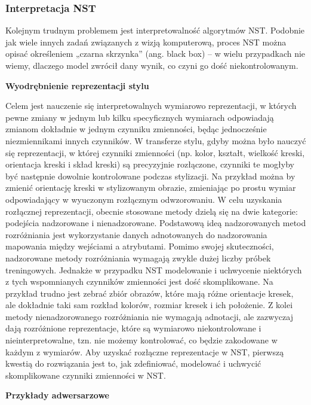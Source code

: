 \documentclass[12pt]{article}
\begin{document}
\subsubsection{Interpretacja NST}

\indent

Kolejnym trudnym problemem jest interpretowalność algorytmów NST. Podobnie jak wiele innych zadań związanych z wizją komputerową, proces NST można opisać określeniem „czarna skrzynka” (ang. black box) – w wielu przypadkach nie wiemy, dlaczego model zwrócił dany wynik, co czyni go dość niekontrolowanym.

\noindent\textbf{Wyodrębnienie reprezentacji stylu}

Celem jest nauczenie się interpretowalnych wymiarowo reprezentacji, w których pewne zmiany w jednym lub kilku specyficznych wymiarach odpowiadają zmianom dokładnie w jednym czynniku zmienności, będąc jednocześnie niezmiennikami innych czynników. W transferze stylu, gdyby można było nauczyć się reprezentacji, w której czynniki zmienności (np. kolor, kształt, wielkość kreski, orientacja kreski i skład kreski) są precyzyjnie rozłączone, czynniki te mogłyby być następnie dowolnie kontrolowane podczas stylizacji. Na przykład można by zmienić orientację kreski w stylizowanym obrazie, zmieniając po prostu wymiar odpowiadający w wyuczonym rozłącznym odwzorowaniu. W celu uzyskania rozłącznej reprezentacji, obecnie stosowane metody dzielą się na dwie kategorie: podejścia nadzorowane i nienadzorowane. Podstawową ideą nadzorowanych metod rozróżniania jest wykorzystanie danych adnotowanych do nadzorowania mapowania między wejściami a atrybutami. Pomimo swojej skuteczności, nadzorowane metody rozróżniania wymagają zwykle dużej liczby próbek treningowych. Jednakże w przypadku NST modelowanie i uchwycenie niektórych z tych wspomnianych czynników zmienności jest dość skomplikowane. Na przykład trudno jest zebrać zbiór obrazów, które mają różne orientacje kresek, ale dokładnie taki sam rozkład kolorów, rozmiar kresek i ich położenie. Z kolei metody nienadzorowanego rozróżniania nie wymagają adnotacji, ale zazwyczaj dają rozróżnione reprezentacje, które są wymiarowo niekontrolowane i nieinterpretowalne, tzn. nie możemy kontrolować, co będzie zakodowane w każdym z wymiarów. Aby uzyskać rozłączne reprezentacje w NST, pierwszą kwestią do rozwiązania jest to, jak zdefiniować, modelować i uchwycić skomplikowane czynniki zmienności w NST.

\noindent\textbf{Przykłady adwersarzowe}
\end{document}

